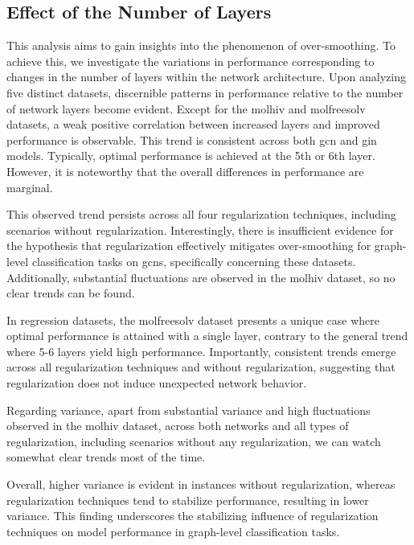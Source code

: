 \subsection{Effect of the Number of Layers}
This analysis aims to gain insights into the phenomenon of over-smoothing. To achieve this, we investigate the variations in performance corresponding to changes in the number of layers within the network architecture.
Upon analyzing five distinct datasets, discernible patterns in performance relative to the number of network layers become evident. Except for the molhiv and molfreesolv datasets, a weak positive correlation between increased layers and improved performance is observable. This trend is consistent across both \ac{gcn} and \ac{gin} models. Typically, optimal performance is achieved at the 5th or 6th layer. However, it is noteworthy that the overall differences in performance are marginal.

This observed trend persists across all four regularization techniques, including scenarios without regularization.
Interestingly, there is insufficient evidence for the hypothesis that regularization effectively mitigates over-smoothing for graph-level classification tasks on \acp{gcn}, specifically concerning these datasets.
Additionally, substantial fluctuations are observed in the molhiv dataset, so no clear trends can be found.

In regression datasets, the molfreesolv dataset presents a unique case where optimal performance is attained with a single layer, contrary to the general trend where 5-6 layers yield high performance. Importantly, consistent trends emerge across all regularization techniques and without regularization, suggesting that regularization does not induce unexpected network behavior.

Regarding variance, apart from substantial variance and high fluctuations observed in the molhiv dataset, across both networks and all types of regularization, including scenarios without any regularization, we can watch somewhat clear trends most of the time.

Overall, higher variance is evident in instances without regularization, whereas regularization techniques tend to stabilize performance, resulting in lower variance. This finding underscores the stabilizing influence of regularization techniques on model performance in graph-level classification tasks.


